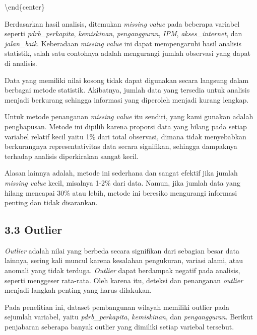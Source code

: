 \documentclass[
  12pt,
]{article}
\begin{document}
\textbackslash end\{center\}

Berdasarkan hasil analisis, ditemukan \textit{missing value} pada
beberapa variabel seperti \textit{pdrb_perkapita}, \textit{kemiskinan},
\textit{pengangguran}, \textit{IPM}, \textit{akses_internet}, dan
\textit{jalan_baik}. Keberadaan \textit{missing value} ini dapat
mempengaruhi hasil analisis statistik, salah satu contohnya adalah
mengurangi jumlah observasi yang dapat di analisis.

Data yang memiliki nilai kosong tidak dapat digunakan secara langsung
dalam berbagai metode statistik. Akibatnya, jumlah data yang tersedia
untuk analisis menjadi berkurang sehingga informasi yang diperoleh
menjadi kurang lengkap.

Untuk metode penanganan \textit{missing value} itu sendiri, yang kami
gunakan adalah penghapusan. Metode ini dipilih karena proporsi data yang
hilang pada setiap variabel relatif kecil yaitu 1\% dari total
observasi, dimana tidak menyebabkan berkurangnya representativitas data
secara signifikan, sehingga dampaknya terhadap analisis diperkirakan
sangat kecil.

Alasan lainnya adalah, metode ini sederhana dan sangat efektif jika
jumlah \textit{missing value} kecil, misalnya 1-2\% dari data. Namun,
jika jumlah data yang hilang mencapai 30\% atau lebih, metode ini
beresiko mengurangi informasi penting dan tidak disarankan.

\subsection{\texorpdfstring{\normalsize 3.3 \hspace {0,5cm}
Outlier}{3.3  Outlier}}\label{outlier}

\vspace{-0.5cm}

\textit{Outlier} adalah nilai yang berbeda secara signifikan dari
sebagian besar data lainnya, sering kali muncul karena kesalahan
pengukuran, variasi alami, atau anomali yang tidak terduga.
\textit{Outlier} dapat berdampak negatif pada analisis, seperti
menggeser rata-rata. Oleh karena itu, deteksi dan penanganan
\textit{outlier} menjadi langkah penting yang harus dilakukan.

Pada penelitian ini, dataset pembangunan wilayah memiliki outlier pada
sejumlah variabel, yaitu \textit{pdrb_perkapita}, \textit{kemiskinan},
dan \textit{pengangguran}. Berikut penjabaran seberapa banyak outlier
yang dimiliki setiap variebal tersebut.

\vspace{-0.5cm}
\end{document}
